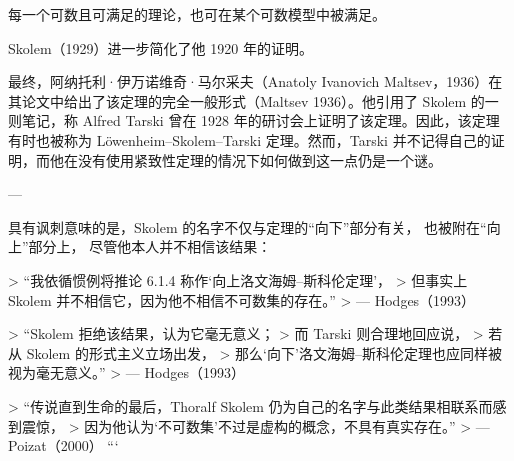 每一个可数且可满足的理论，也可在某个可数模型中被满足。

Skolem（1929）进一步简化了他 1920 年的证明。  

最终，阿纳托利·伊万诺维奇·马尔采夫（Anatoly Ivanovich Maltsev，1936）在其论文中给出了该定理的完全一般形式（Maltsev 1936）。他引用了 Skolem 的一则笔记，称 Alfred Tarski 曾在 1928 年的研讨会上证明了该定理。因此，该定理有时也被称为 Löwenheim–Skolem–Tarski 定理。然而，Tarski 并不记得自己的证明，而他在没有使用紧致性定理的情况下如何做到这一点仍是一个谜。

---

具有讽刺意味的是，Skolem 的名字不仅与定理的“向下”部分有关，  
也被附在“向上”部分上，  
尽管他本人并不相信该结果：

> “我依循惯例将推论 6.1.4 称作‘向上洛文海姆–斯科伦定理’，  
> 但事实上 Skolem 并不相信它，因为他不相信不可数集的存在。”  
> — Hodges（1993）

> “Skolem 拒绝该结果，认为它毫无意义；  
> 而 Tarski 则合理地回应说，  
> 若从 Skolem 的形式主义立场出发，  
> 那么‘向下’洛文海姆–斯科伦定理也应同样被视为毫无意义。”  
> — Hodges（1993）

> “传说直到生命的最后，Thoralf Skolem 仍为自己的名字与此类结果相联系而感到震惊，  
> 因为他认为‘不可数集’不过是虚构的概念，不具有真实存在。”  
> — Poizat（2000）
```
